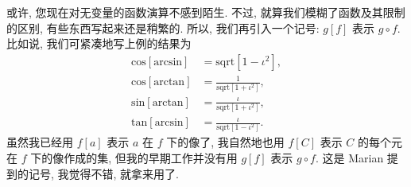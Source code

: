 \begin{remark}
    或许, 您现在对无变量的函数演算不感到陌生. 不过, 就算我们模糊了函数及其限制的区别, 有些东西写起来还是稍繁的. 所以, 我们再引入一个记号: $g[f]$ 表示 $g \circ f$. 比如说, 我们可紧凑地写上例的结果为
    \begin{align*}
        \mathrm{cos} [\mathrm{arcsin}] & = \mathrm{sqrt} [1 - \iota^2],               \\
        \mathrm{cos} [\mathrm{arctan}] & = \frac{1}{\mathrm{sqrt} [1 + \iota^2]},     \\
        \mathrm{sin} [\mathrm{arctan}] & = \frac{\iota}{\mathrm{sqrt} [1 + \iota^2]}, \\
        \mathrm{tan} [\mathrm{arcsin}] & = \frac{\iota}{\mathrm{sqrt} [1 - \iota^2]}.
    \end{align*}
    虽然我已经用 $f[a]$ 表示 $a$ 在 $f$ 下的像了, 我自然地也用 $f[C]$ 表示 $C$ 的每个元在 $f$ 下的像作成的集, 但我的早期工作并没有用 $g[f]$ 表示 $g \circ f$. 这是 Marian 提到的记号, 我觉得不错, 就拿来用了.
\end{remark}
